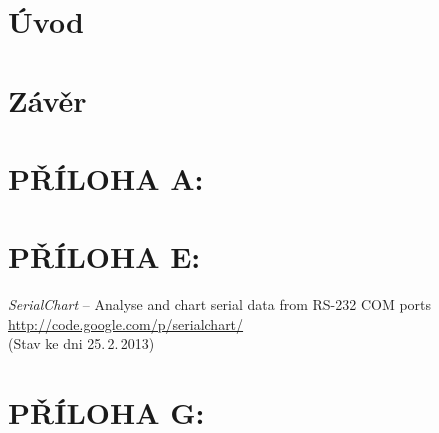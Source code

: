 \documentclass[12pt, a4paper, oneside]{article}
\newcommand{\D}{\medskip \noindent} %
\newcommand{\B}{\textbf} %
\newcommand{\It}{\textit}  %
\begin{document}

\addtolength{\textheight}{30mm} %

\newpage
\pagestyle{plain}

\setlength{\voffset}{-20mm} %
\setcounter{page}{1}  %

\tableofcontents  %

\addtolength{\textheight}{-30mm} %
\newpage
\setlength{\voffset}{0mm} %
\pagestyle{plain}

\section*{Úvod}
\label{uvod}



\newpage
\section*{Závěr}



\newpage
\section*{PŘÍLOHA A:}


\newpage
 \section*{PŘÍLOHA E:}
 \begin{thebibliography}{99}

     \It{SerialChart} -- Analyse and chart serial data from RS-232 COM ports \\
    \url{http://code.google.com/p/serialchart/}\\
    (Stav ke dni 25.\,2.\,2013)


\end{thebibliography}

\newpage
\section*{PŘÍLOHA G:}
~
\listoffigures   %
\end{document}
